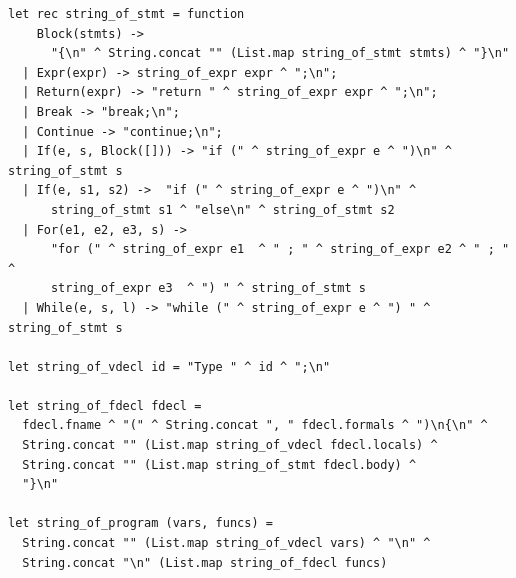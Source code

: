 \documentclass[12pt,A4]{book}
\begin{document}
\begin{verbatim}
let rec string_of_stmt = function
    Block(stmts) ->
      "{\n" ^ String.concat "" (List.map string_of_stmt stmts) ^ "}\n"
  | Expr(expr) -> string_of_expr expr ^ ";\n";
  | Return(expr) -> "return " ^ string_of_expr expr ^ ";\n";
  | Break -> "break;\n";
  | Continue -> "continue;\n";
  | If(e, s, Block([])) -> "if (" ^ string_of_expr e ^ ")\n" ^ string_of_stmt s
  | If(e, s1, s2) ->  "if (" ^ string_of_expr e ^ ")\n" ^
      string_of_stmt s1 ^ "else\n" ^ string_of_stmt s2
  | For(e1, e2, e3, s) ->
      "for (" ^ string_of_expr e1  ^ " ; " ^ string_of_expr e2 ^ " ; " ^
      string_of_expr e3  ^ ") " ^ string_of_stmt s
  | While(e, s, l) -> "while (" ^ string_of_expr e ^ ") " ^ string_of_stmt s

let string_of_vdecl id = "Type " ^ id ^ ";\n"

let string_of_fdecl fdecl =
  fdecl.fname ^ "(" ^ String.concat ", " fdecl.formals ^ ")\n{\n" ^
  String.concat "" (List.map string_of_vdecl fdecl.locals) ^
  String.concat "" (List.map string_of_stmt fdecl.body) ^
  "}\n"

let string_of_program (vars, funcs) =
  String.concat "" (List.map string_of_vdecl vars) ^ "\n" ^
  String.concat "\n" (List.map string_of_fdecl funcs)
\end{verbatim}
\end{document}
